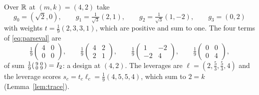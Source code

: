 \begin{example}\label{ex:chartworked}
Over $\mathbb{R}$ at $(m,k)=(4,2)$ take
\[
  g_0=(\sqrt2,0),\qquad
  g_1=\tfrac1{\sqrt3}(2,1),\qquad
  g_2=\tfrac1{\sqrt3}(1,-2),\qquad
  g_3=(0,2)
\]
with weights $t=\tfrac19(2,3,3,1)$, which are positive and sum to one.
The four terms of \eqref{eq:parseval} are
\[
  \tfrac19\begin{pmatrix}4&0\\0&0\end{pmatrix},\qquad
  \tfrac19\begin{pmatrix}4&2\\2&1\end{pmatrix},\qquad
  \tfrac19\begin{pmatrix}1&-2\\-2&4\end{pmatrix},\qquad
  \tfrac19\begin{pmatrix}0&0\\0&4\end{pmatrix},
\]
of sum $\tfrac19\begin{psmallmatrix}9&0\\0&9\end{psmallmatrix}=I_2$: a
design at $(4,2)$.  The leverages are
$\ell=(2,\tfrac53,\tfrac53,4)$ and the leverage scores
$s_c=t_c\ell_c=\tfrac19(4,5,5,4)$, which sum to $2=k$
(Lemma~\ref{lem:trace}).


\end{example}
